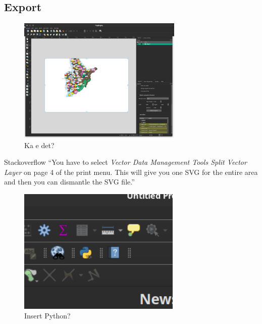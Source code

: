 \subsection{Export}
\begin{frame}
    \begin{figure}
        \centering
        \includegraphics[height = 6cm]{images/qgis_export.png}%
        \caption{Ka e det?}
    \end{figure}
\end{frame}

\begin{frame}
    \begin{block}{Stackoverflow}
        \enquote{You have to select \textit{Vector Data Management Tools Split Vector Layer} on page 4 of the print menu. This will give you one SVG for the entire area and then you can dismantle the SVG file.}
    \end{block}
\end{frame}


\begin{frame}
    \begin{figure}
        \centering
        \includegraphics[height = 6cm]{images/qgis_python.png}%
        \caption{Insert Python?}
    \end{figure}
\end{frame}

